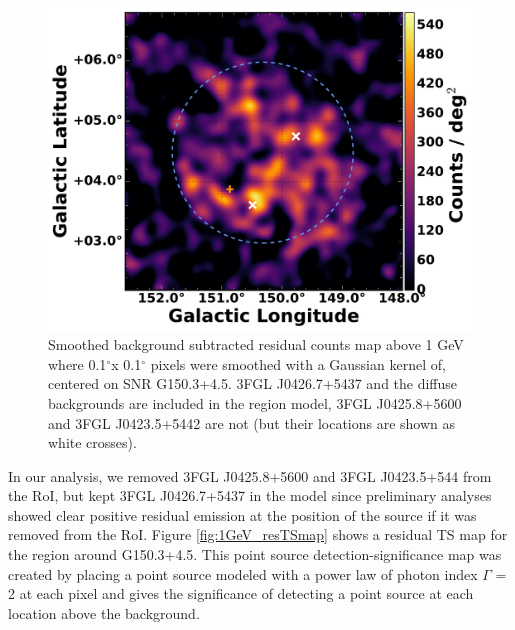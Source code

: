 \documentclass[iop]{emulateapj}
\newcommand{\gam}{$\gamma$-ray}
\newcommand{\Gone}{G150.3+4.5}
\newcommand{\psrLike}{3FGL J0426.7+5437}
\begin{document}
\begin{figure}[!ht]
	\begin{centering}
		\includegraphics[width=\columnwidth]{G150_1GeV_source_w3FGL_noLabs.pdf}
		\caption[Smoothed background subtracted residual counts map above 1 GeV for \Gone{}]{Smoothed background subtracted residual counts map above 1 GeV where 0.1$^\circ$x 0.1$^\circ$ pixels were smoothed with a Gaussian kernel of, centered on SNR \Gone. \psrLike{} and the diffuse backgrounds are included in the region model, 3FGL J0425.8+5600 and 3FGL J0423.5+5442 are not (but their locations are shown as white crosses). %
			\label{fig:1GeV_cmaps}}
	\end{centering}
\end{figure}

In our analysis, we removed 3FGL J0425.8+5600 and 3FGL J0423.5+544 from the RoI, but kept \psrLike{} in the model since preliminary analyses showed clear positive residual emission at the position of the source if it was removed from the RoI. Figure \ref{fig:1GeV_resTSmap} shows a residual TS map for the region around \Gone. This point source detection-significance map was created by placing a point source modeled with a power law of photon index $\Gamma$ = 2  at each pixel and gives the significance of detecting a point source at each location above the background. 
\end{document}
